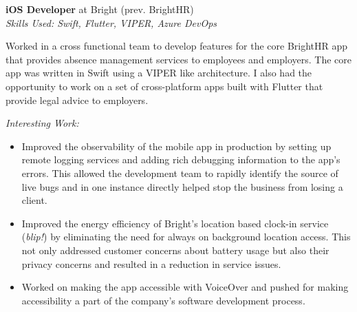\textbf{iOS Developer} at Bright (prev. BrightHR) \\
\textit{Skills Used: Swift, Flutter, VIPER, Azure DevOps}

Worked in a cross functional team to develop features for the core BrightHR app
that provides absence management services to employees and employers. The core
app was written in Swift using a VIPER like architecture. I also had the
opportunity to work on a set of cross-platform apps built with Flutter that
provide legal advice to employers.

\medskip

\textit{Interesting Work:}

\smallskip

\begin{itemize}
\item Improved the observability of the mobile app in production by setting up
  remote logging services and adding rich debugging information to the app's
  errors. This allowed the development team to rapidly identify the source of
  live bugs and in one instance directly helped stop the business from losing a
  client.

\item Improved the energy efficiency of Bright's location based clock-in service
  (\emph{blip!}) by eliminating the need for always on background location
  access. This not only addressed customer concerns about battery usage but also
  their privacy concerns and resulted in a reduction in service issues.

\item Worked on making the app accessible with VoiceOver and pushed for making
  accessibility a part of the company's software development process.

\end{itemize}

